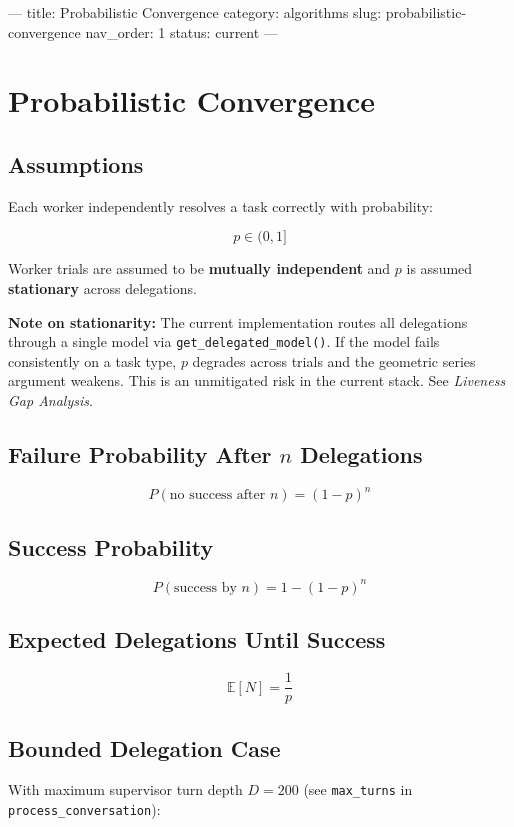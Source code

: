 ---
title: Probabilistic Convergence
category: algorithms
slug: probabilistic-convergence
nav_order: 1
status: current
---

\section{Probabilistic Convergence}

\subsection*{Assumptions}

Each worker independently resolves a task correctly with probability:

\[ p \in (0,1] \]

Worker trials are assumed to be \textbf{mutually independent} and $p$ is assumed
\textbf{stationary} across delegations.

\textbf{Note on stationarity:} The current implementation routes all delegations
through a single model via \texttt{get\_delegated\_model()}. If the model fails
consistently on a task type, $p$ degrades across trials and the geometric series
argument weakens. This is an unmitigated risk in the current stack.
See \textit{Liveness Gap Analysis}.

\subsection*{Failure Probability After $n$ Delegations}

\[ P(\text{no success after } n) = (1-p)^n \]

\subsection*{Success Probability}

\[ P(\text{success by } n) = 1 - (1-p)^n \]

\subsection*{Expected Delegations Until Success}

\[ \mathbb{E}[N] = \frac{1}{p} \]

\subsection*{Bounded Delegation Case}

With maximum supervisor turn depth $D = 200$ (see \texttt{max\_turns} in
\texttt{process\_conversation}):

